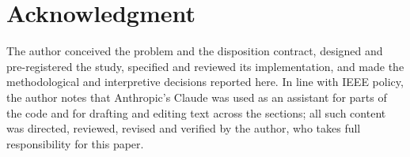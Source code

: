 \section*{Acknowledgment}
The author conceived the problem and the disposition contract, designed and pre-registered the study, specified and reviewed its implementation, and made the methodological and interpretive decisions reported here. In line with IEEE policy, the author notes that Anthropic's Claude was used as an assistant for parts of the code and for drafting and editing text across the sections; all such content was directed, reviewed, revised and verified by the author, who takes full responsibility for this paper.
